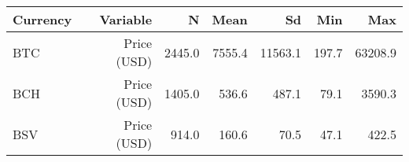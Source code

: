 
\begin{tabular}[t]{lrrrrrr}
\toprule
Currency & Variable & N & Mean & Sd & Min & Max\\
\midrule
BTC & Price (USD) & 2445.0 & 7555.4 & 11563.1 & 197.7 & 63208.9\\
BCH & Price (USD) & 1405.0 & 536.6 & 487.1 & 79.1 & 3590.3\\
BSV & Price (USD) & 914.0 & 160.6 & 70.5 & 47.1 & 422.5\\
\bottomrule
\end{tabular}
